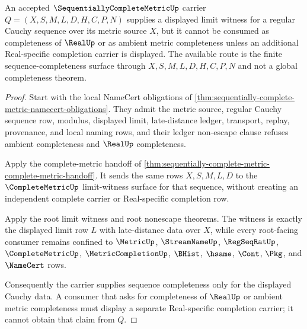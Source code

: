 \begin{theorem}
\label{thm:sequentially-complete-metric-real-refusal-boundary}
An accepted $\SequentiallyCompleteMetricUp$ carrier $Q=(X,S,M,L,D,H,C,P,N)$ supplies a displayed limit witness for a regular Cauchy sequence over its metric source $X$, but it cannot be consumed as completeness of $\RealUp$ or as ambient metric completeness unless an additional Real-specific completion carrier is displayed. The available route is the finite sequence-completeness surface through $X,S,M,L,D,H,C,P,N$ and not a global completeness theorem.
\end{theorem}
\begin{proof}
Start with the local NameCert obligations of \autoref{thm:sequentially-complete-metric-namecert-obligations}. They admit the metric source, regular Cauchy sequence row, modulus, displayed limit, late-distance ledger, transport, replay, provenance, and local naming rows, and their ledger non-escape clause refuses ambient completeness and $\RealUp$ completeness.

Apply the complete-metric handoff of \autoref{thm:sequentially-complete-metric-complete-metric-handoff}. It sends the same rows $X,S,M,L,D$ to the $\CompleteMetricUp$ limit-witness surface for that sequence, without creating an independent complete carrier or Real-specific completion row.

Apply the root limit witness and root nonescape theorems. The witness is exactly the displayed limit row $L$ with late-distance data over $X$, while every root-facing consumer remains confined to $\MetricUp$, $\StreamNameUp$, $\RegSeqRatUp$, $\CompleteMetricUp$, $\MetricCompletionUp$, $\BHist$, $\hsame$, $\Cont$, $\Pkg$, and $\NameCert$ rows.

Consequently the carrier supplies sequence completeness only for the displayed Cauchy data. A consumer that asks for completeness of $\RealUp$ or ambient metric completeness must display a separate Real-specific completion carrier; it cannot obtain that claim from $Q$.
\end{proof}

